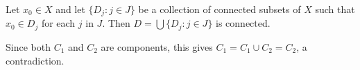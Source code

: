 Let $x_0 \in X$ and let $\{D_j: j \in J\}$ be a collection of connected subsets of $X$ such that $x_0 \in D_j$ for each $j$ in $J$. Then $D = \bigcup \{D_j: j \in J\}$ is connected.

Since both $C_1$ and $C_2$ are components, this gives $C_1 = C_1 \cup C_2 = C_2$, a contradiction.